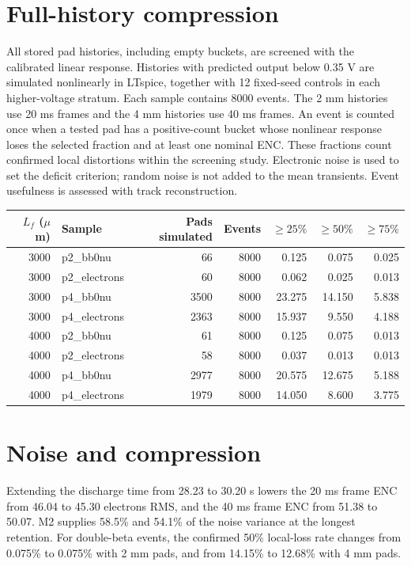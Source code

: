 \documentclass[10pt,a4paper]{article}
\begin{document}
\section{Full-history compression}
All stored pad histories, including empty buckets, are screened with the
calibrated linear response. Histories with predicted output below 0.35 V are
simulated nonlinearly in LTspice, together with 12 fixed-seed controls in each
higher-voltage stratum. Each sample contains 8000 events. The 2 mm histories
use 20 ms frames and the 4 mm histories use 40 ms frames.
An event is counted once when a tested pad has a positive-count bucket whose
nonlinear response loses the selected fraction and at least one nominal ENC.
These fractions count confirmed local distortions within the screening study.
Electronic noise is used to set the deficit criterion; random noise is not
added to the mean transients. Event usefulness is assessed with track reconstruction.
\begin{center}\scriptsize
\begin{longtable}{rlrrrrr}\toprule
$L_f$ ($\mu$m) & Sample & Pads simulated & Events & $\geq25\%$ & $\geq50\%$ & $\geq75\%$\\\midrule
3000 & p2\_bb0nu & 66 & 8000 & 0.125 & 0.075 & 0.025 \\
3000 & p2\_electrons & 60 & 8000 & 0.062 & 0.025 & 0.013 \\
3000 & p4\_bb0nu & 3500 & 8000 & 23.275 & 14.150 & 5.838 \\
3000 & p4\_electrons & 2363 & 8000 & 15.937 & 9.550 & 4.188 \\
4000 & p2\_bb0nu & 61 & 8000 & 0.125 & 0.075 & 0.013 \\
4000 & p2\_electrons & 58 & 8000 & 0.037 & 0.013 & 0.013 \\
4000 & p4\_bb0nu & 2977 & 8000 & 20.575 & 12.675 & 5.188 \\
4000 & p4\_electrons & 1979 & 8000 & 14.050 & 8.600 & 3.775 \\
\bottomrule\end{longtable}\end{center}

\section{Noise and compression}
Extending the discharge time from 28.23 to 30.20 s lowers the 20 ms frame ENC from 46.04 to 45.30 electrons RMS, and the 40 ms frame ENC from 51.38 to 50.07. M2 supplies 58.5\% and 54.1\% of the noise variance at the longest retention. For double-beta events, the confirmed 50\% local-loss rate changes from 0.075\% to 0.075\% with 2 mm pads, and from 14.15\% to 12.68\% with 4 mm pads.
\end{document}
